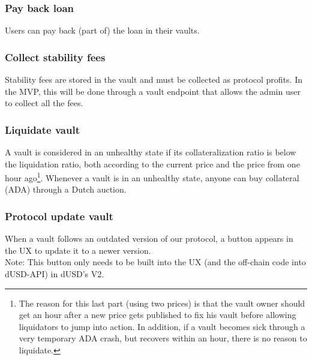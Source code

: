 \documentclass{article} %
\begin{document}
\subsubsection*{Pay back loan}

Users can pay back (part of) the loan in their vaults.

\subsubsection*{Collect stability fees}

Stability fees are stored in the vault and must be collected as protocol
profits. In the MVP, this will be done through a vault endpoint that allows the
admin user to collect all the fees. \\


\subsubsection*{Liquidate vault}

A vault is considered in an unhealthy state if its collateralization ratio is
below the liquidation ratio, both according to the current price and the price
from one hour ago\footnote{
  The reason for this last part (using two prices) is that the vault owner
  should get an hour after a new price gets published to fix his vault before
  allowing liquidators to jump into action. In addition, if a vault becomes sick
  through a very temporary ADA crash, but recovers within an hour, there is no
  reason to liquidate.}.
Whenever a vault is in an unhealthy state, anyone can buy collateral (ADA)
through a Dutch auction.

\subsubsection*{Protocol update vault}

When a vault follows an outdated version of our protocol, a button appears in
the UX to update it to a newer version. \\

Note: This button only needs to be built into the UX (and the off-chain code
into dUSD-API) in dUSD's V2.
\end{document}
